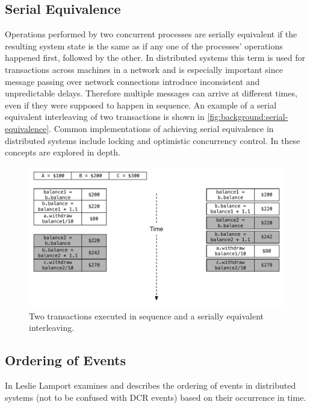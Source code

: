 		\subsection{Serial Equivalence}
		Operations performed by two concurrent processes are serially equivalent if the resulting system state is the same as if any one of the processes' operations happened first, followed by the other. In distributed systems this term is used for transactions across machines in a network and is especially important since message passing over network connections introduce inconsistent and unpredictable delays. Therefore multiple messages can arrive at different times, even if they were supposed to happen in sequence. An example of a serial equivalent interleaving of two transactions is shown in \autoref{fig:background:serial-equivalence}. Common implementations of achieving serial equivalence in distributed systems include locking and optimistic concurrency control. In \cite{Coulouris:2011:DSC:2029110:chapter16} these concepts are explored in depth.
		
		\begin{figure}[H]
		\centering
		\includegraphics[width=\textwidth]{2background/images/serial-equivalence.pdf}
		\caption{Two transactions executed in sequence and a serially equivalent interleaving.}
		\label{fig:background:serial-equivalence}
		\end{figure}
		
		\subsection{Ordering of Events}\label{subsec:orderingofevents}
		In \cite{Lamport:1978:TCO:359545.359563} Leslie Lamport examines and describes the ordering of events in distributed systems (not to be confused with DCR events) based on their occurrence in time.

